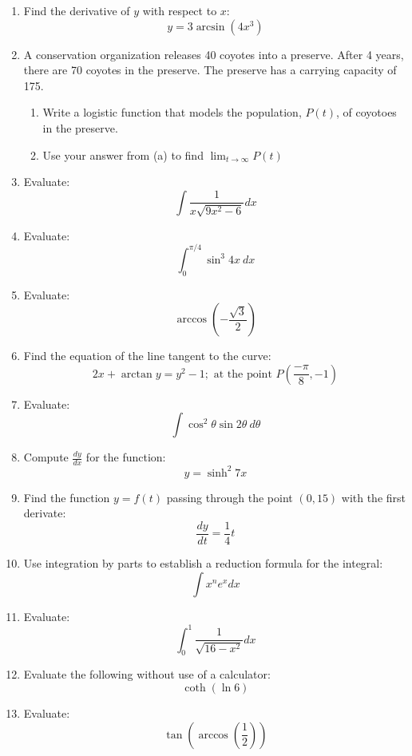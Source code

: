 \documentclass[fleqn]{article}
\begin{document}
\begin{multicols}{2}
\begin{enumerate}

\item Find the derivative of \(y\) with respect to \(x\):
\[y=3\arcsin(4x^3)\]

\item A conservation organization releases 40 coyotes into a preserve. After 4 years, there are 70 coyotes in the preserve. The preserve has a carrying capacity of 175.
\begin{enumerate}[label=\alph*)]
\item Write a logistic function that models the population, \(P(t)\), of coyotoes in the preserve.
\item Use your answer from (a) to find \(\displaystyle\lim_{t\to\infty}P(t)\)
\end{enumerate}

\item Evaluate:
\[\int\frac{1}{x\sqrt{9x^2-6}}dx\]

\item Evaluate:
\[\int_0^{\pi/4}\sin^3 4x\ dx\]

\item Evaluate:
\[\arccos\left(-\frac{\sqrt{3}}{2}\right)\]

\item Find the equation of the line tangent to the curve:
\[2x+\arctan y=y^2-1;\text{ at the point }P(\frac{-\pi}{8},-1)\]

\item Evaluate:
\[\int\cos^2\theta\sin 2\theta\ d\theta\]

\item Compute \(\frac{dy}{dx}\) for the function:
\[y=\sinh^2 7x\]

\item Find the function \(y=f(t)\) passing through the point \((0,15)\) with the first derivate:
\[\frac{dy}{dt}=\frac{1}{4}t\]

\item Use integration by parts to establish a reduction formula for the integral:
\[\int x^n e^x dx\]

\item Evaluate:
\[\int_0^1\frac{1}{\sqrt{16-x^2}}dx\]

\item Evaluate the following without use of a calculator:
\[\coth(\ln 6)\]

\item Evaluate:
\[\tan\left(\arccos\left(\frac{1}{2}\right)\right)\]


\end{enumerate}
\end{multicols}
\end{document}
